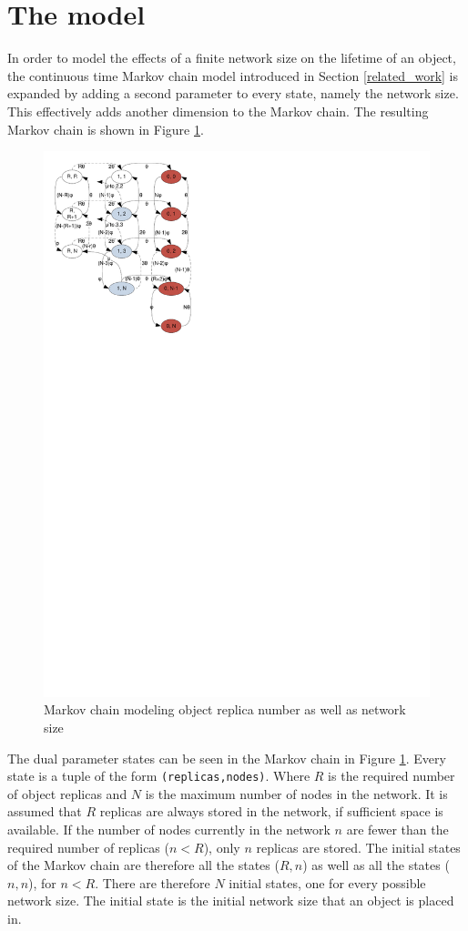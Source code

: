\documentclass[10pt,a4paper,conference]{IEEEtran}
\begin{document}
\section{The model}
\label{model}

In order to model the effects of a finite network size on the lifetime of an object, the continuous time Markov chain model introduced in Section \ref{related_work} is expanded by adding a second parameter to every state, namely the network size. This effectively adds another dimension to the Markov chain. The resulting Markov chain is shown in Figure \ref{fig_markov_chain}.

\begin{figure}[htbp]
 \centering
 \includegraphics[clip=true, viewport=0.5cm 19.5cm 8.5cm 29.5cm, width=0.7\columnwidth]{Markov_chain_repair_compact}
 \caption{Markov chain modeling object replica number as well as network size}
 \label{fig_markov_chain}
\end{figure}


The dual parameter states can be seen in the Markov chain in Figure \ref{fig_markov_chain}. Every state is a tuple of the form \verb.(replicas,nodes).. Where $R$ is the required number of object replicas and $N$ is the maximum number of nodes in the network. It is assumed that $R$ replicas are always stored in the network, if sufficient space is available. If the number of nodes currently in the network $n$ are fewer than the required number of replicas ($n < R$), only $n$ replicas are stored. The initial states of the Markov chain are therefore all the states ($R,n$) as well as all the states ($n,n$), for $n < R$. There are therefore $N$ initial states, one for every possible network size. The initial state is the initial network size that an object is placed in.
\end{document}
